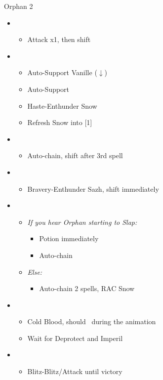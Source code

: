 \begin{battle}{Orphan 2}
	\begin{itemize}
		\item \fourth
			\begin{itemize}
				\item Attack x1, then shift
			\end{itemize}
		\item \sixth
			\begin{itemize}
				\item Auto-Support Vanille ($\downarrow$)
				\item Auto-Support
				\item Haste-Enthunder Snow
				\item Refresh Snow into [1]
			\end{itemize}
		\item \first
			\begin{itemize}
				\item Auto-chain, shift after 3rd spell
			\end{itemize}
		\item \sixth
			\begin{itemize}
				\item Bravery-Enthunder Sazh, shift immediately
			\end{itemize}
		\item \first
			\begin{itemize}
				\item \textit{If you hear Orphan starting to Slap:}
					\begin{itemize}
						\item Potion immediately
						\item Auto-chain
					\end{itemize}
				\item \textit{Else:}
					\begin{itemize}
						\item Auto-chain 2 spells, RAC Snow
					\end{itemize}
			\end{itemize}
		\item \third
			\begin{itemize}
				\item Cold Blood, should \stagger~during the animation
				\item Wait for Deprotect and Imperil
			\end{itemize}
		\item \fourth
			\begin{itemize}
				\item Blitz-Blitz/Attack until victory
			\end{itemize}
	\end{itemize}
\end{battle}